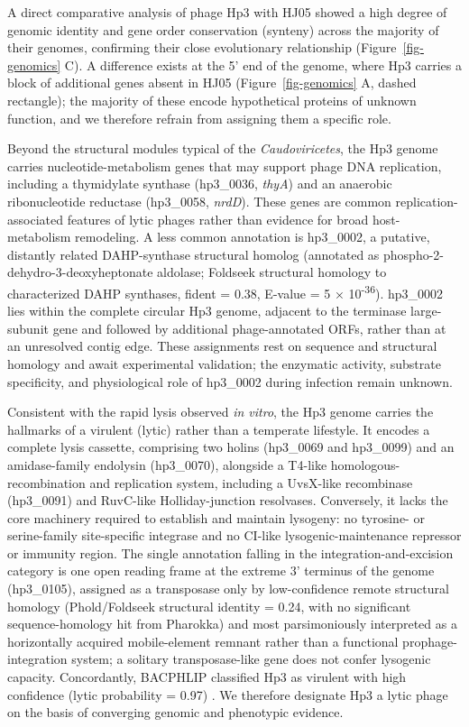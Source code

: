A direct comparative analysis of phage Hp3 with HJ05 showed a high
degree of genomic identity and gene order conservation (synteny) across
the majority of their genomes, confirming their close evolutionary
relationship (Figure~\ref{fig-genomics} C). A difference exists
at the 5' end of the genome, where Hp3 carries a block of additional
genes absent in HJ05 (Figure~\ref{fig-genomics} A, dashed rectangle);
the majority of these encode hypothetical proteins of unknown function,
and we therefore refrain from assigning them a specific role.

Beyond the structural modules typical of the \emph{Caudoviricetes}, the
Hp3 genome carries nucleotide-metabolism genes that may support phage
DNA replication, including a thymidylate synthase (hp3\_0036,
\emph{thyA}) and an anaerobic ribonucleotide reductase (hp3\_0058,
\emph{nrdD}). These genes are common replication-associated features of
lytic phages rather than evidence for broad host-metabolism remodeling.
A less common annotation is hp3\_0002, a putative, distantly related
DAHP-synthase structural homolog (annotated as
phospho-2-dehydro-3-deoxyheptonate aldolase; Foldseek structural
homology to characterized DAHP synthases, fident = 0.38, E-value = 5 ×
10\textsuperscript{-36}). hp3\_0002 lies within the complete circular
Hp3 genome, adjacent to the terminase large-subunit gene and followed by
additional phage-annotated ORFs, rather than at an unresolved contig
edge. These assignments rest on sequence and structural homology and
await experimental validation; the enzymatic activity, substrate
specificity, and physiological role of hp3\_0002 during infection remain
unknown.

Consistent with the rapid lysis observed \emph{in vitro}, the Hp3 genome
carries the hallmarks of a virulent (lytic) rather than a temperate
lifestyle. It encodes a complete lysis cassette, comprising two holins (hp3\_0069 and
hp3\_0099) and an amidase-family endolysin (hp3\_0070), alongside a
T4-like homologous-recombination and replication system, including a
UvsX-like recombinase (hp3\_0091) and RuvC-like Holliday-junction
resolvases. Conversely, it lacks the core machinery required to establish
and maintain lysogeny: no tyrosine- or serine-family site-specific
integrase and no CI-like lysogenic-maintenance repressor or immunity
region. The single annotation falling in the integration-and-excision
category is one open reading frame at the extreme 3' terminus of the
genome (hp3\_0105), assigned as a transposase only by low-confidence remote
structural homology (Phold/Foldseek structural identity = 0.24, with no
significant sequence-homology hit from Pharokka) and most parsimoniously
interpreted as a horizontally acquired mobile-element remnant rather than a
functional prophage-integration system; a solitary transposase-like gene
does not confer lysogenic capacity. Concordantly, BACPHLIP classified Hp3
as virulent with high confidence (lytic probability = 0.97)
\citep{2021-BACPHLIP_Hockenberry}. We therefore designate Hp3 a lytic phage
on the basis of converging genomic and phenotypic evidence.

